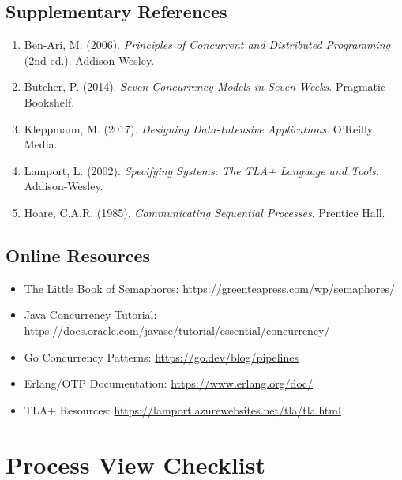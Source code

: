 \documentclass[11pt,letterpaper]{article}
\begin{document}
\subsection{Supplementary References}

\begin{enumerate}[resume]
    \item Ben-Ari, M. (2006). \textit{Principles of Concurrent and Distributed Programming} (2nd ed.). Addison-Wesley.
    
    \item Butcher, P. (2014). \textit{Seven Concurrency Models in Seven Weeks}. Pragmatic Bookshelf.
    
    \item Kleppmann, M. (2017). \textit{Designing Data-Intensive Applications}. O'Reilly Media.
    
    \item Lamport, L. (2002). \textit{Specifying Systems: The TLA+ Language and Tools}. Addison-Wesley.
    
    \item Hoare, C.A.R. (1985). \textit{Communicating Sequential Processes}. Prentice Hall.
\end{enumerate}

\subsection{Online Resources}

\begin{itemize}
    \item The Little Book of Semaphores: \url{https://greenteapress.com/wp/semaphores/}
    \item Java Concurrency Tutorial: \url{https://docs.oracle.com/javase/tutorial/essential/concurrency/}
    \item Go Concurrency Patterns: \url{https://go.dev/blog/pipelines}
    \item Erlang/OTP Documentation: \url{https://www.erlang.org/doc/}
    \item TLA+ Resources: \url{https://lamport.azurewebsites.net/tla/tla.html}
\end{itemize}

\appendix

\section{Process View Checklist}
\end{document}
